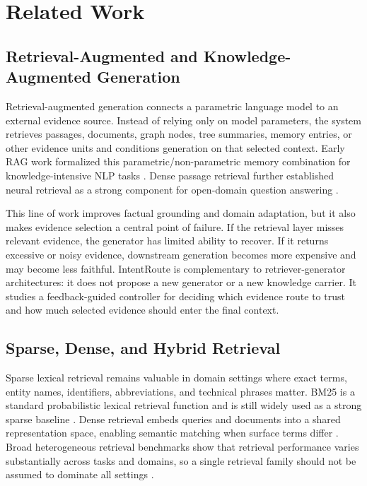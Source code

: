 
\section{Related Work}
\label{sec:03-related-work:related-work}

\subsection{Retrieval-Augmented and Knowledge-Augmented Generation}
\label{sec:03-related-work:retrieval-augmented-and-knowledge-augmented-generation}

Retrieval-augmented generation connects a parametric language model to an external evidence source. Instead of relying only on model parameters, the system retrieves passages, documents, graph nodes, tree summaries, memory entries, or other evidence units and conditions generation on that selected context. Early RAG work formalized this parametric/non-parametric memory combination for knowledge-intensive NLP tasks \citep{lewis2020rag}. Dense passage retrieval further established neural retrieval as a strong component for open-domain question answering \citep{karpukhin2020dpr}.

This line of work improves factual grounding and domain adaptation, but it also makes evidence selection a central point of failure. If the retrieval layer misses relevant evidence, the generator has limited ability to recover. If it returns excessive or noisy evidence, downstream generation becomes more expensive and may become less faithful. IntentRoute is complementary to retriever-generator architectures: it does not propose a new generator or a new knowledge carrier. It studies a feedback-guided controller for deciding which evidence route to trust and how much selected evidence should enter the final context.

\subsection{Sparse, Dense, and Hybrid Retrieval}
\label{sec:03-related-work:sparse-dense-and-hybrid-retrieval}

Sparse lexical retrieval remains valuable in domain settings where exact terms, entity names, identifiers, abbreviations, and technical phrases matter. BM25 is a standard probabilistic lexical retrieval function and is still widely used as a strong sparse baseline \citep{robertson2009bm25}. Dense retrieval embeds queries and documents into a shared representation space, enabling semantic matching when surface terms differ \citep{karpukhin2020dpr}. Broad heterogeneous retrieval benchmarks show that retrieval performance varies substantially across tasks and domains, so a single retrieval family should not be assumed to dominate all settings \citep{thakur2021beir}.

